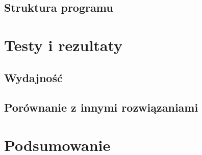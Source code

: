 \documentclass[a4paper,12pt,oneside]{book} %
\begin{document}
\section{Struktura programu}

\chapter{Testy i rezultaty}

\section{Wydajność}
\section{Porównanie z innymi rozwiązaniami}

\chapter{Podsumowanie}




\end{document}
